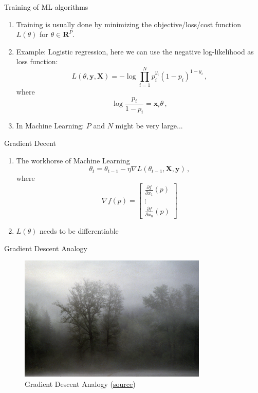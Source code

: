 \documentclass[10pt,handout]{beamer}
\begin{document}
\begin{frame}{Training of ML algorithms}

\begin{enumerate}
\item Training is usually done by minimizing the objective/loss/cost function $L(\theta)$ for $\theta \in \mathbf{R}^P$.
\item Example: Logistic regression, here we can use the {\color{uured} negative} log-likelihood as loss function:
\[
L(\theta, \mathbf{y}, \mathbf{X}) = - \log \prod^N_{i=1} p_i^{y_i} (1 - p_i)^{1-y_i} \,,
\]
where
\[
\log \frac{p_i}{1-p_i} = \mathbf{x}_i \theta  \,,
\]\pause
\item In Machine Learning: $P$ and $N$ might be very large...
\end{enumerate}


\end{frame}



\begin{frame}{Gradient Decent}

\begin{enumerate}
\item The workhorse of Machine Learning
\[
\theta_t = \theta_{t-1} - \eta \nabla L(\theta_{t-1}, \mathbf{X}, \mathbf{y})\,,
\]
where
\[
\nabla f(p)=\begin{bmatrix}{\frac {\partial f}{\partial x_{1}}}(p)\\\vdots \\{\frac {\partial f}{\partial x_{n}}}(p)\end{bmatrix}
\]
\item $L(\theta)$ needs to be differentiable
\end{enumerate}

\end{frame}


\begin{frame}{Gradient Descent Analogy}

\begin{figure}[h]
\caption{Gradient Descent Analogy (\href{https://en.wikipedia.org/wiki/Gradient_descent}{source})}
\centering
\includegraphics[width=0.8\textwidth]{figs/Okanogan-Wenatchee_National_Forest_morning_fog_shrouds_trees.jpg}
\end{figure}


\end{frame}
\end{document}
